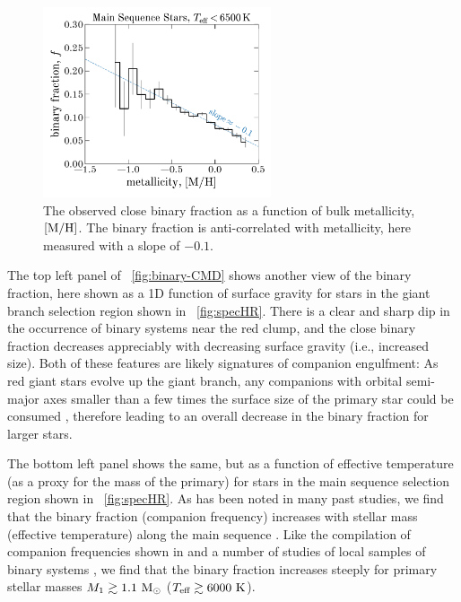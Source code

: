 \documentclass[modern]{aastex63}
\begin{document}
\begin{figure}[!t]
    \begin{center}
    \includegraphics[width=0.6\textwidth]{fraction_M_H.pdf}
    \end{center}
    \caption{%
    The observed close binary fraction as a function of bulk metallicity, $[{\rm
    M}/{\rm H}]$.
    The binary fraction is anti-correlated with metallicity, here measured with
    a slope of $-0.1$.
    \label{fig:binfrac-mh}
    }
\end{figure}

The top left panel of \figurename~\ref{fig:binary-CMD} shows another view of the
binary fraction, here shown as a 1D function of surface gravity for stars in the
giant branch selection region shown in \figurename~\ref{fig:specHR}.
There is a clear and sharp dip in the occurrence of binary systems near the red
clump, and the close binary fraction decreases appreciably with decreasing
surface gravity (i.e., increased size).
Both of these features are likely signatures of companion engulfment: As red
giant stars evolve up the giant branch, any companions with orbital semi-major
axes smaller than a few times the surface size of the primary star could be
consumed \citep{Ivanova:2013}, therefore leading to an overall decrease in the
binary fraction for larger stars.

The bottom left panel shows the same, but as a function of effective temperature
(as a proxy for the mass of the primary) for stars in the main sequence
selection region shown in \figurename~\ref{fig:specHR}.
As has been noted in many past studies, we find that the binary fraction
(companion frequency) increases with stellar mass (effective temperature) along
the main sequence \citep[e.g.,][]{Duchene:2013}.
Like the compilation of companion frequencies shown in \cite{Duchene:2013} and a
number of studies of local samples of binary systems
\citep[e.g.,][]{Eggleton:2008, Raghavan:2010, Gao:2014}, we find that the binary
fraction increases steeply for primary stellar masses $M_1 \gtrsim 1.1~\mathrm{M}_\odot$
($T_{\textrm{eff}} \gtrsim 6000~\textrm{K}$).
\end{document}
